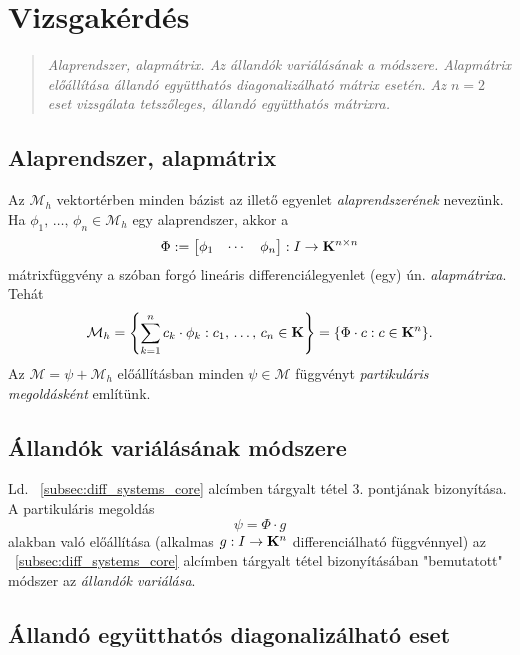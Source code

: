 \newpage
\section{Vizsgakérdés}
\begin{quote}
	\textit{Alaprendszer, alapmátrix. Az állandók variálásának a módszere. Alapmátrix előállítása állandó együtthatós diagonalizálható mátrix esetén. Az $n=2$ eset vizsgálata tetszőleges, állandó együtthatós mátrixra.}
\end{quote}

\subsection{Alaprendszer, alapmátrix}

Az $\mathcal{M}_h$ vektortérben minden bázist az illető egyenlet \textit{alaprendszerének} nevezünk. Ha $\phi_1, \, \dots, \, \phi_n \in \mathcal{M}_h$ egy alaprendszer, akkor a
\[
	\Phi := \begin{bmatrix}
		\phi_1 & \cdots & \phi_n
	\end{bmatrix} : I \to \mathbf{K}^{n \times n}
\]
mátrixfüggvény a szóban forgó lineáris differenciálegyenlet (egy) ún. \textit{alapmátrixa}. Tehát
\[
	\mathcal{M}_h = \left\{ \sum_{k=1}^n c_k \cdot \phi_k : c_1, \, \dots, \, c_n \in \mathbf{K} \right\} = \{ \Phi \cdot c : c \in \mathbf{K}^n \}.
\]
Az $\mathcal{M} = \psi + \mathcal{M}_h$ előállításban minden $\psi \in \mathcal{M}$ függvényt \textit{partikuláris megoldásként} említünk.

\subsection{Állandók variálásának módszere}
Ld. ~\ref{subsec:diff_systems_core} alcímben tárgyalt tétel 3. pontjának bizonyítása. A partikuláris megoldás
\[
	\psi = \Phi \cdot g
\]
alakban való előállítása (alkalmas $g : I \to \mathbf{K}^n$ differenciálható függvénnyel) az ~\ref{subsec:diff_systems_core} alcímben tárgyalt tétel bizonyításában "bemutatott" módszer az \textit{állandók variálása}.

\subsection{Állandó együtthatós diagonalizálható eset}

